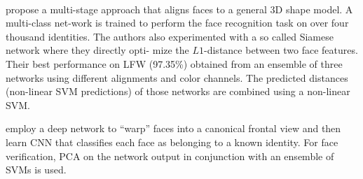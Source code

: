 \\
\par
{} propose a multi-stage approach that aligns faces to a general 3D shape model. A multi-class net-work is trained to perform the face recognition task on over four thousand identities. The authors also experimented with a so called Siamese network where they directly opti-
mize the $L1$-distance between two face features. Their best performance on LFW (97.35\%) obtained from an ensemble of three networks using different alignments and color channels. The predicted distances (non-linear SVM predictions) of those networks are combined using a non-linear SVM.
\\
\par
{} employ a deep network  to “warp” faces into a canonical frontal view and then learn CNN that classifies each face as belonging to a known identity. For face verification, PCA on the network output in conjunction with an ensemble of SVMs is used.
